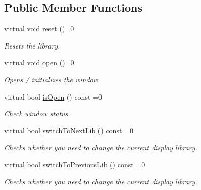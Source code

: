 \subsection*{Public Member Functions}
\begin{DoxyCompactItemize}
\item 
\mbox{\label{classArcade_1_1Display_1_1IDisplayModule_a2a05e0a55f30774cb8a75be63663b6f9}} 
virtual void \mbox{\hyperlink{classArcade_1_1Display_1_1IDisplayModule_a2a05e0a55f30774cb8a75be63663b6f9}{reset}} ()=0
\begin{DoxyCompactList}\small\item\em Resets the library. \end{DoxyCompactList}\item 
\mbox{\label{classArcade_1_1Display_1_1IDisplayModule_ae1984127ec0c8a73e4f26ee4517bd226}} 
virtual void \mbox{\hyperlink{classArcade_1_1Display_1_1IDisplayModule_ae1984127ec0c8a73e4f26ee4517bd226}{open}} ()=0
\begin{DoxyCompactList}\small\item\em Opens / initializes the window. \end{DoxyCompactList}\item 
virtual bool \mbox{\hyperlink{classArcade_1_1Display_1_1IDisplayModule_a34c86dd2e7aa60a70c0cc06ccbd34e47}{is\+Open}} () const =0
\begin{DoxyCompactList}\small\item\em Check window status. \end{DoxyCompactList}\item 
virtual bool \mbox{\hyperlink{classArcade_1_1Display_1_1IDisplayModule_a0de47361c9d47bf8fc52070b945f23b7}{switch\+To\+Next\+Lib}} () const =0
\begin{DoxyCompactList}\small\item\em Checks whether you need to change the current display library. \end{DoxyCompactList}\item 
virtual bool \mbox{\hyperlink{classArcade_1_1Display_1_1IDisplayModule_a498d51597164e9f92e97ec2afee426b0}{switch\+To\+Previous\+Lib}} () const =0
\begin{DoxyCompactList}\small\item\em Checks whether you need to change the current display library. \end{DoxyCompactList}\item 

\end{DoxyCompactItemize}
